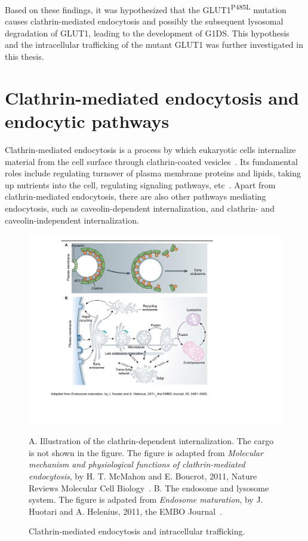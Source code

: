 Based on these findings, it was hypothesized that the GLUT1\textsuperscript{P485L} mutation causes clathrin-mediated endocytosis and possibly the subsequent lysosomal degradation of GLUT1, leading to the development of G1DS. This hypothesis and the intracellular trafficking of the mutant GLUT1 was further investigated in this thesis.

\section{Clathrin-mediated endocytosis and endocytic pathways}
Clathrin-mediated endocytosis is a process by which eukaryotic cells internalize material from the cell surface through clathrin-coated vesicles~\cite{McMahon}. Its fundamental roles include regulating turnover of plasma membrane proteins and lipids, taking up nutrients into the cell, regulating signaling pathways, etc~\cite{McMahon,Humphries}. Apart from clathrin-mediated endocytosis, there are also other pathways mediating endocytosis, such as caveolin-dependent internalization, and clathrin- and caveolin-independent internalization.
\begin{figure}[h]
\centering
\includegraphics[scale=0.7]{Figures/endocytosis}
\caption{Clathrin-mediated endocytosis and intracellular trafficking.}
\vspace*{-3mm}
\small \justify
A. Illustration of the clathrin-dependent internalization. The cargo is not shown in the figure. The figure is adapted from \textit{Molecular mechanism and physiological functions of clathrin-mediated endocytosis}, by H. T. McMahon and E. Boucrot, 2011, Nature Reviews Molecular Cell Biology~\cite{McMahon}. B. The endosome and lysosome system. The figure is adpated from \textit{Endosome maturation}, by J. Huotari and A. Helenius, 2011, the EMBO Journal~\cite{Huotari}. 
\label{fig:endocytosis}
\end{figure}

